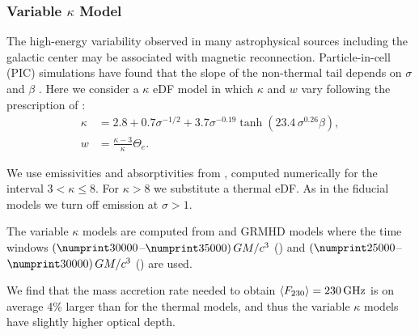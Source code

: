 \subsubsection{Variable \texorpdfstring{$\kappa$}{kappa} Model}

The high-energy variability observed in many astrophysical sources including the galactic center may be associated with
magnetic reconnection.
Particle-in-cell (PIC) simulations have found that the slope of the non-thermal tail depends on  $\sigma$ and $\beta$ \citep[see, e.g.,][]{2018ApJ...862...80B}.  Here we consider a $\kappa$ eDF model in which $\kappa$ and $w$ vary  following the prescription of \cite{2018ApJ...862...80B}:
\begin{align}
  \kappa &= 2.8 +0.7\sigma^{-1/2} + 3.7\sigma^{-0.19}\tanh{(23.4\,\sigma^{0.26}\beta)}, \label{eq:kappa}\\
  w      &= \frac{ \kappa -3 }{\kappa} \Theta_e.
\end{align}

We use emissivities and absorptivities from  \cite{2016ApJ...822...34P}, computed numerically for the interval $3 < \kappa \le 8$.
For $\kappa > 8$ we substitute a thermal eDF.
As in the fiducial models we turn off emission at $\sigma > 1$.

The variable $\kappa$ models are computed from \hamr and \bhac GRMHD models where the time windows
$(\no{30000}$--$\no{35000})\,\tg$ (\hamr) and
$(\no{25000}$--$\no{30000})\,\tg$ (\bhac) are used.

We find that the mass accretion rate needed to obtain $\langle F_{230} \rangle = 230\,\mathrm{GHz}$ is on average 4\% larger than for the thermal models, and thus the variable $\kappa$ models have slightly higher optical depth.


